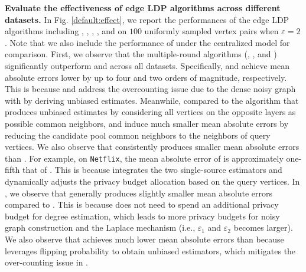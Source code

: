 \noindent
\textbf{Evaluate the effectiveness of edge LDP algorithms across different datasets.} 
In Fig. \ref{default:effect}, we report the performances of the edge LDP algorithms including \naive, \bs, \advss, \advds, and \advdeg on $100$ uniformly sampled vertex pairs when $\varepsilon = 2$. 
{Note that we also include the performance of \cdp under the centralized model for comparison.} 
First, we observe that the multiple-round algorithms (\advss, \advds, and \advdeg) significantly outperform \naive and \bs across all datasets. 
Specifically, \advss and \advds achieve mean absolute errors lower by up to four and two orders of magnitude, respectively. 
This is because \advss and \advds address the overcounting issue due to the dense noisy graph with \naive by deriving unbiased estimates. 
Meanwhile, compared to the \bs algorithm that produces unbiased estimates by considering all vertices on the opposite layers as possible common neighbors, \advss and \advds induce much smaller mean absolute errors by reducing the candidate pool common neighbors to the neighbors of query vertices. 
We also observe that \advds consistently produces smaller mean absolute errors than \advss. 
For example, on \texttt{Netflix}, the mean absolute error of \advds is approximately one-fifth that of \advss. 
This is because \advds integrates the two single-source estimators and dynamically adjusts the privacy budget allocation based on the query vertices. 
{
In \figuresixa, we observe that \advdeg generally produces slightly smaller mean absolute errors compared to \advds. 
This is because \advdeg does not need to spend an additional privacy budget for degree estimation, which leads to more privacy budgets for noisy graph construction and the Laplace mechanism (i.e., $\varepsilon_1$ and $\varepsilon_2$ becomes larger). }
We also observe that \bs achieves much lower mean absolute errors than \naive because \bs leverages flipping probability to obtain unbiased estimators, which mitigates the over-counting issue in \naive. 

